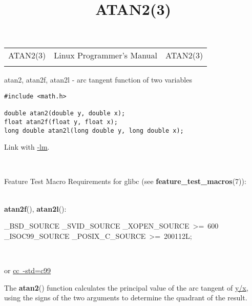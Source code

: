 \documentclass[]{article}
\title{ATAN2(3)}
\author{}
\date{}
\let\realtextbf=\textbf
\renewcommand{\textbf}[1]{\textcolor{boldcolor}{\realtextbf{#1}}}
\renewcommand{\emph}[1]{\underline{#1}}
\begin{document}
\maketitle

\begin{longtable}[c]{@{}lll@{}}
\toprule\addlinespace
ATAN2(3) & Linux Programmer's Manual & ATAN2(3)
\\\addlinespace
\bottomrule
\end{longtable}


atan2, atan2f, atan2l - arc tangent function of two variables


\begin{verbatim}
#include <math.h>

double atan2(double y, double x);
float atan2f(float y, float x);
long double atan2l(long double y, long double x);
\end{verbatim}

Link with \emph{-lm}.

~

Feature Test Macro Requirements for glibc (see
\textbf{feature\_test\_macros}(7)): \\

~

\textbf{atan2f}(), \textbf{atan2l}():

\_BSD\_SOURCE \textbar{}\textbar{} \_SVID\_SOURCE \textbar{}\textbar{}
\_XOPEN\_SOURCE~\textgreater{}=~600 \textbar{}\textbar{}
\_ISOC99\_SOURCE \textbar{}\textbar{}
\_POSIX\_C\_SOURCE~\textgreater{}=~200112L;

~

or \emph{cc~-std=c99}


The \textbf{atan2}() function calculates the principal value of the arc
tangent of \emph{y/x}, using the signs of the two arguments to determine
the quadrant of the result.
\end{document}
